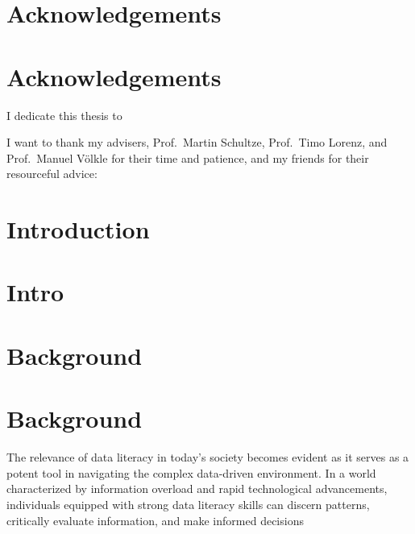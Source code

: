 \documentclass[
  12pt,
  a4paper,
  twoside]{article}
\begin{document}
\hypertarget{acknowledgements}{%
\section*{Acknowledgements}\label{acknowledgements}}

\hypertarget{acknowledgements-1}{%
\section*{Acknowledgements}\label{acknowledgements-1}}

I dedicate this thesis to

I want to thank my advisers, Prof.~Martin Schultze, Prof.~Timo Lorenz, and Prof.~Manuel Völkle for their time and patience, and my friends for their resourceful advice:

\newpage\null\thispagestyle{empty}\newpage

\hypertarget{introduction}{%
\section*{Introduction}\label{introduction}}

\hypertarget{intro}{%
\section{Intro}\label{intro}}

\hypertarget{background}{%
\section*{Background}\label{background}}

\hypertarget{background-1}{%
\section{Background}\label{background-1}}

The relevance of data literacy in today's society becomes evident as it serves as a potent tool in navigating the complex data-driven environment. In a world characterized by information overload and rapid technological advancements, individuals equipped with strong data literacy skills can discern patterns, critically evaluate information, and make informed decisions
\end{document}
